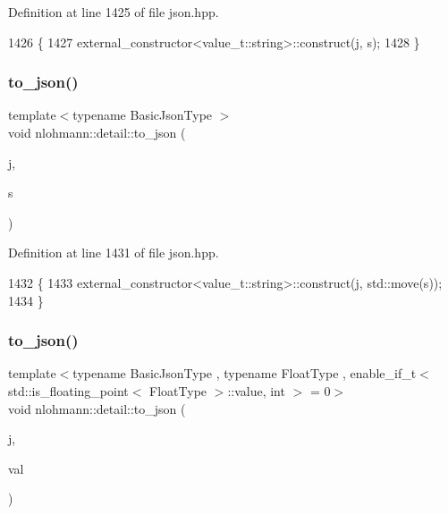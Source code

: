 Definition at line 1425 of file json.\+hpp.


\begin{DoxyCode}
1426 \{
1427     external\_constructor<value\_t::string>::construct(j, s);
1428 \}
\end{DoxyCode}
\mbox{\label{namespacenlohmann_1_1detail_a4aa1ca6b7c61bf19d1f30ea5b669f68e}} 
\subsubsection{\texorpdfstring{to\+\_\+json()}{to\_json()}\hspace{0.1cm}{\footnotesize\ttfamily [3/16]}}
{\footnotesize\ttfamily template$<$typename Basic\+Json\+Type $>$ \\
void nlohmann\+::detail\+::to\+\_\+json (\begin{DoxyParamCaption}\item[{Basic\+Json\+Type \&}]{j,  }\item[{typename Basic\+Json\+Type\+::string\+\_\+t \&\&}]{s }\end{DoxyParamCaption})}



Definition at line 1431 of file json.\+hpp.


\begin{DoxyCode}
1432 \{
1433     external\_constructor<value\_t::string>::construct(j, std::move(s));
1434 \}
\end{DoxyCode}
\mbox{\label{namespacenlohmann_1_1detail_a22bffdc8bc7e43af380ba2050696b230}} 
\subsubsection{\texorpdfstring{to\+\_\+json()}{to\_json()}\hspace{0.1cm}{\footnotesize\ttfamily [4/16]}}
{\footnotesize\ttfamily template$<$typename Basic\+Json\+Type , typename Float\+Type , enable\+\_\+if\+\_\+t$<$ std\+::is\+\_\+floating\+\_\+point$<$ Float\+Type $>$\+::value, int $>$  = 0$>$ \\
void nlohmann\+::detail\+::to\+\_\+json (\begin{DoxyParamCaption}\item[{Basic\+Json\+Type \&}]{j,  }\item[{Float\+Type}]{val }\end{DoxyParamCaption})\hspace{0.3cm}{\ttfamily [noexcept]}}



